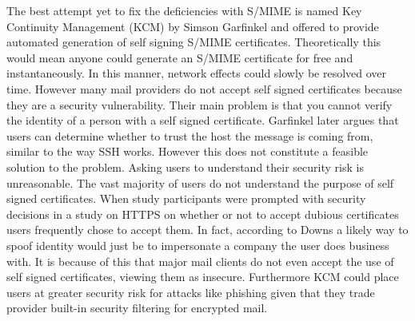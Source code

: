 \documentclass[10pt]{article}
\begin{document}
\begin{multicols}{2}
\par The best attempt yet to fix the deficiencies with S/MIME is named Key Continuity Management (KCM) by Simson Garfinkel and offered to provide automated generation of self signing S/MIME certificates\cite{garfinkel2005johnny}. Theoretically this would mean anyone could generate an S/MIME certificate for free and instantaneously. In this manner, network effects could slowly be resolved over time. However many mail providers do not accept self signed certificates because they are a security vulnerability. Their main problem is that you cannot verify the identity of a person with a self signed certificate. Garfinkel later argues that users can determine whether to trust the host the message is coming from, similar to the way SSH works\cite{garfinkel2005make}. However this does not constitute a feasible solution to the problem. Asking users to understand their security risk is unreasonable. The vast majority of users do not understand the purpose of self signed certificates\cite{downs2006decision}. When study participants were prompted with security decisions in a study on HTTPS on whether or not to accept dubious certificates users frequently chose to accept them\cite{callegati2009man}. In fact, according to Downs a likely way to spoof identity would just be to impersonate a company the user does business with\cite{downs2006decision}. It is because of this that major mail clients do not even accept the use of self signed certificates, viewing them as insecure\cite{force-use-of-self}. Furthermore KCM could place users at greater security risk for attacks like phishing given that they trade provider built-in security filtering for encrypted mail.

\end{multicols}
\end{document}

